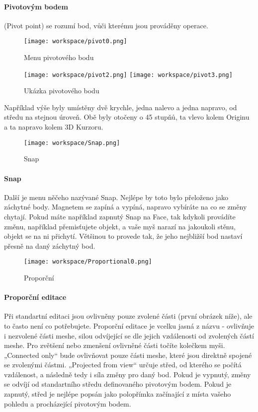 \documentclass[12pt,a4paper]{report}
\begin{document}
	\paragraph{Pivotovým bodem} (Pivot point) se rozumí bod, vůči kterému jsou
	prováděny operace.
	
	\begin{figure}[h]
		\centering
		\texttt{[image: workspace/pivot0.png]}
		\caption{Menu pivotového bodu}
		\label{pic:pivot0}
	\end{figure}
	\begin{figure}[h]
		\centering
		\texttt{[image: workspace/pivot2.png]}
		\texttt{[image: workspace/pivot3.png]}
		\caption{Ukázka pivotového bodu}
		\label{pic:pivot2-3}
	\end{figure}

	Například výše byly umístěny dvě krychle, jedna nalevo a jedna napravo,
	od středu na stejnou úroveň. Obě byly otočeny o 45 stupňů, ta vlevo kolem
	Originu a ta napravo kolem 3D Kurzoru.
	
	\begin{figure}[h]
		\centering
		\texttt{[image: workspace/Snap.png]}
		\caption{Snap}
		\label{pic:snap}
	\end{figure}
	
	\paragraph{Snap} Další je menu něčeho nazývané Snap. Nejlépe by toto bylo
	přeloženo jako záchytné body. Magnetem se zapíná a vypíná, napravo
	vybíráte na co se změny chytají. Pokud máte například zapnutý Snap na
	Face, tak kdykoli provádíte změnu, například přemisťujete objekt, a vaše
	myš narazí na jakoukoli stěnu, objekt se na ni přichytí. Většinou to
	provede tak, že jeho nejbližší bod nastaví přesně na daný záchytný bod.
	
	\begin{figure}[h]
		\centering
		\texttt{[image: workspace/Proportional0.png]}
		\caption{Proporční}
		\label{pic:proportional0}
	\end{figure}

	\paragraph{Proporční editace} Při standartní editaci jsou ovlivněny pouze zvolené
	části (první obrázek níže), ale to často není co potřebujete. Proporční
	editace je vcelku jasná z názvu - ovlivňuje i nezvolené části meshe, silou
	odvíjející se dle jejich vzdálenosti od zvolených částí meshe. Pro zvětšení
	nebo zmenšení ovlivněné části točíte kolečkem myši. „Connected only“
	bude ovlivňovat pouze části meshe, které jsou direktně spojené se
	zvolenými částmi. „Projected from view“ určuje střed, od kterého se
	počítá vzdálenost, a následně tedy i síla změny pro daný bod. Pokud je
	vypnutý, změny se odvíjí od standartního středu definovaného pivotovým
	bodem. Pokud je zapnutý, střed je nejlépe popsán jako polopřímka
	začínající z místa vašeho pohledu a procházející pivotovým bodem.
	
\end{document}
